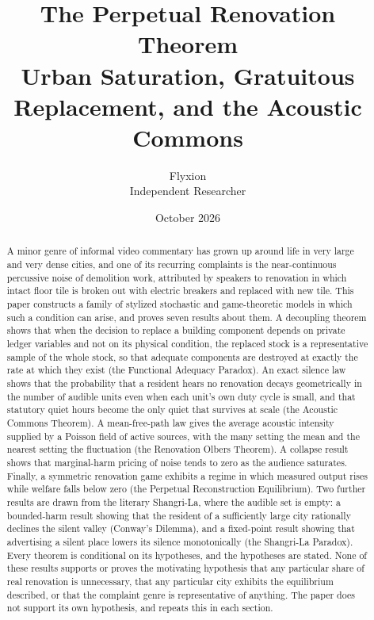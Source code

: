 \documentclass[11pt]{article}
\title{The Perpetual Renovation Theorem\\[0.5em]
\large Urban Saturation, Gratuitous Replacement, and the Acoustic Commons}
\author{Flyxion\\ Independent Researcher}
\date{October 2026}
\theoremstyle{definition}
\theoremstyle{remark}
\begin{document}
\maketitle

\begin{abstract}
\noindent A minor genre of informal video commentary has grown up around life in very large and very dense cities, and one of its recurring complaints is the near-continuous percussive noise of demolition work, attributed by speakers to renovation in which intact floor tile is broken out with electric breakers and replaced with new tile. This paper constructs a family of stylized stochastic and game-theoretic models in which such a condition can arise, and proves seven results about them. A decoupling theorem shows that when the decision to replace a building component depends on private ledger variables and not on its physical condition, the replaced stock is a representative sample of the whole stock, so that adequate components are destroyed at exactly the rate at which they exist (the Functional Adequacy Paradox). An exact silence law shows that the probability that a resident hears no renovation decays geometrically in the number of audible units even when each unit's own duty cycle is small, and that statutory quiet hours become the only quiet that survives at scale (the Acoustic Commons Theorem). A mean-free-path law gives the average acoustic intensity supplied by a Poisson field of active sources, with the many setting the mean and the nearest setting the fluctuation (the Renovation Olbers Theorem). A collapse result shows that marginal-harm pricing of noise tends to zero as the audience saturates. Finally, a symmetric renovation game exhibits a regime in which measured output rises while welfare falls below zero (the Perpetual Reconstruction Equilibrium). Two further results are drawn from the literary Shangri-La, where the audible set is empty: a bounded-harm result showing that the resident of a sufficiently large city rationally declines the silent valley (Conway's Dilemma), and a fixed-point result showing that advertising a silent place lowers its silence monotonically (the Shangri-La Paradox). Every theorem is conditional on its hypotheses, and the hypotheses are stated. None of these results supports or proves the motivating hypothesis that any particular share of real renovation is unnecessary, that any particular city exhibits the equilibrium described, or that the complaint genre is representative of anything. The paper does not support its own hypothesis, and repeats this in each section.
\end{abstract}
\end{document}
